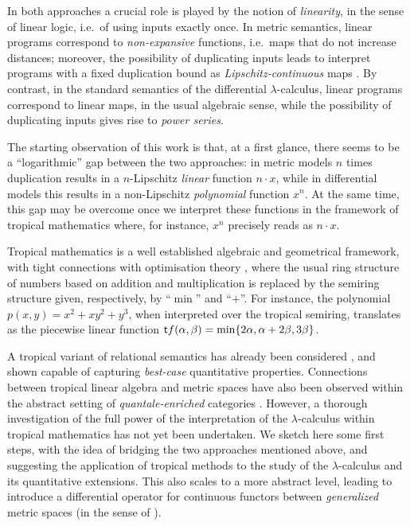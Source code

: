\documentclass[submission,%
]{eptcs}
\begin{document}
In both approaches a crucial role is played by the notion of \emph{linearity}, in the sense of linear logic, i.e.~of using inputs exactly once. In metric semantics, linear programs correspond to \emph{non-expansive} functions, i.e.\ maps that do not increase distances; moreover, the possibility of duplicating inputs leads to interpret programs with a fixed duplication bound as \emph{Lipschitz-continuous} maps \cite{Gaboardi2017}.
By contrast, in the standard semantics of the differential $\lambda$-calculus, linear programs correspond to linear maps, in the usual algebraic sense, while the possibility of duplicating inputs gives rise to \emph{power series}.

The starting observation of this work is that, at a first glance, there seems to be a  ``logarithmic'' gap between the two approaches:
in metric models $n$ times duplication results in a $n$-Lipschitz \emph{linear} function $n\cdot x$, while in differential models this results in a non-Lipschitz \emph{polynomial} function $x^{n}$.
 At the same time, 
this gap may be overcome once we interpret these functions in the framework of tropical mathematics where, for instance, $x^{n}$ precisely reads as $n\cdot x$.

Tropical mathematics \cite{Simon} is a well established algebraic and geometrical framework, with tight connections with optimisation theory \cite{Sturmfelds}, where the usual ring structure of numbers based on addition and multiplication is replaced by the semiring structure given, respectively, by ``$\min$'' and ``$+$''.
For instance, the polynomial $p(x,y)=x^{2}+xy^{2}+y^{3}$, when interpreted over the tropical semiring, translates as the piecewise linear function
$
\mathsf{t} f(\alpha,\beta)=\min\{2\alpha, \alpha+2\beta, 3\beta\}
$.

A tropical variant of relational semantics has already been considered \cite{Manzo2013}, and shown capable of capturing \emph{best-case} quantitative properties.
Connections between tropical linear algebra and metric spaces have also been observed \cite{Fuji} within the abstract setting of \emph{quantale-enriched} categories \cite{Hofmann2014, Stubbe2014}.
However, a thorough investigation of the full power of the interpretation of the $\lambda$-calculus within tropical mathematics has not yet been undertaken.
We sketch here some first steps, with the idea of bridging the two approaches mentioned above, and suggesting the application of tropical methods to the study of the $\lambda$-calculus and its quantitative extensions.
This also scales to a 
more abstract level, leading to introduce a differential operator for continuous functors between \emph{generalized} metric spaces (in the sense of \cite{Lawvere1973}).
\end{document}
